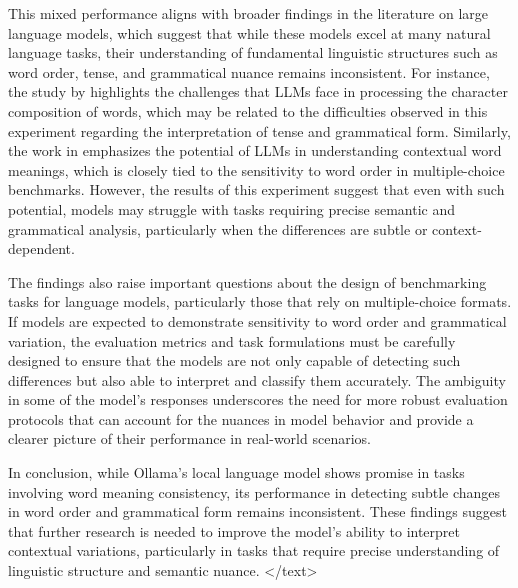 \documentclass{article}
\begin{document}
This mixed performance aligns with broader findings in the literature on large language models, which suggest that while these models excel at many natural language tasks, their understanding of fundamental linguistic structures such as word order, tense, and grammatical nuance remains inconsistent. For instance, the study by \cite{2405.11357v3} highlights the challenges that LLMs face in processing the character composition of words, which may be related to the difficulties observed in this experiment regarding the interpretation of tense and grammatical form. Similarly, the work in \cite{2310.14025v1} emphasizes the potential of LLMs in understanding contextual word meanings, which is closely tied to the sensitivity to word order in multiple-choice benchmarks. However, the results of this experiment suggest that even with such potential, models may struggle with tasks requiring precise semantic and grammatical analysis, particularly when the differences are subtle or context-dependent.

The findings also raise important questions about the design of benchmarking tasks for language models, particularly those that rely on multiple-choice formats. If models are expected to demonstrate sensitivity to word order and grammatical variation, the evaluation metrics and task formulations must be carefully designed to ensure that the models are not only capable of detecting such differences but also able to interpret and classify them accurately. The ambiguity in some of the model's responses underscores the need for more robust evaluation protocols that can account for the nuances in model behavior and provide a clearer picture of their performance in real-world scenarios.

In conclusion, while Ollama's local language model shows promise in tasks involving word meaning consistency, its performance in detecting subtle changes in word order and grammatical form remains inconsistent. These findings suggest that further research is needed to improve the model's ability to interpret contextual variations, particularly in tasks that require precise understanding of linguistic structure and semantic nuance.
</text>
\end{document}
